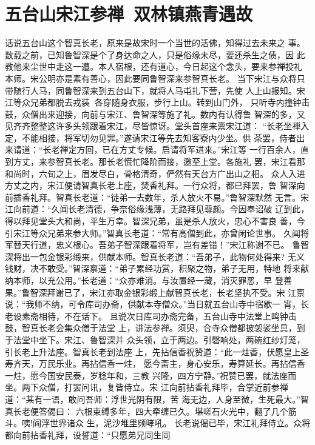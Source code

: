 \chapter{五台山宋江参禅~双林镇燕青遇故}

话说五台山这个智真长老，原来是故宋时一个当世的活佛，知得过去未来之
事。数载之前，已知鲁智深是个了身达命之人，只是俗缘未尽，要还杀生之债，因
此教他来尘世中走这一遭。本人宿根，还有道心，今日起这个念头，要来参禅投礼
本师。宋公明亦是素有善心，因此要同鲁智深来参智真长老。
当下宋江与众将只带随行人马，同鲁智深来到五台山下，就将人马屯扎下营，先使
人上山报知。宋江等众兄弟都脱去戎装，各穿随身衣服，步行上山。转到山门外，
只听寺内撞钟击鼓，众僧出来迎接，向前与宋江、鲁智深等施了礼。数内有认得鲁
智深的多，又见齐齐整整这许多头领跟着宋江，尽皆惊讶。堂头首座来禀宋江道：
“长老坐禅入定，不能相接，将军切勿见罪。”遂请宋江等先去知客寮内少坐。供
茶罢，侍者出来请道：“长老禅定方回，已在方丈专候。启请将军进来。”宋江等
一行百余人，直到方丈，来参智真长老。那长老慌忙降阶而接，邀至上堂。各施礼
罢，宋江看那和尚时，六旬之上，眉发尽白，骨格清奇，俨然有天台方广出山之相。
众人入进方丈之内，宋江便请智真长老上座，焚香礼拜。一行众将，都已拜罢，鲁
智深向前插香礼拜。智真长老道：“徒弟一去数年，杀人放火不易。”鲁智深默然
无言。宋江向前道：“久闻长老清德，争奈俗缘浅薄，无路拜见尊颜。今因奉诏破
辽到此，得以拜见堂头大和尚，平生万幸。智深兄弟，虽是杀人放火，忠心不害良
善，今引宋江等众兄弟来参大师。”智真长老道：“常有高僧到此，亦曾闲论世事。
久闻将军替天行道，忠义根心。吾弟子智深跟着将军，岂有差错！”宋江称谢不已。
鲁智深将出一包金银彩缎来，供献本师。智真长老道：“吾弟子，此物何处得来?
无义钱财，决不敢受。”智深禀道：“弟子累经功赏，积聚之物，弟子无用，特地
将来献纳本师，以充公用。”长老道：“众亦难消。与汝置经一藏，消灭罪恶，早
登善果。”鲁智深拜谢已了，宋江亦取金银彩缎上献智真长老，长老坚执不受。宋
江禀说：“我师不纳，可令库司办斋，供献本寺僧众。”当日就五台山寺中宿歇一
宵，长老设素斋相待，不在话下。
且说次日库司办斋完备，五台山寺中法堂上鸣钟击鼓，智真长老会集众僧于法堂
上，讲法参禅。须臾，合寺众僧都披袈裟坐具，到于法堂中坐下。宋江、鲁智深并
众头领，立于两边。引磬响处，两碗红纱灯笼，引长老上升法座。智真长老到法座
上，先拈信香祝赞道：“此一炷香，伏愿皇上圣寿齐天，万民乐业。再拈信香一炷，
愿今斋主，身心安乐，寿算延长。再拈信香一炷，愿今国安民泰，岁稔年和，三教
兴隆，四方宁静。”祝赞已罢，就法座而坐。两下众僧，打罢问讯，复皆侍立。宋
江向前拈香礼拜毕，合掌近前参禅道：“某有一语，敢问吾师：浮世光阴有限，苦
海无边，人身至微，生死最大。”智真长老便答偈曰：
六根束缚多年，四大牵缠已久。堪嗟石火光中，翻了几个筋斗。咦!阎浮世界诸众
生，泥沙堆里频哮吼。
长老说偈已毕，宋江礼拜侍立。众将都向前拈香礼拜，设誓道：“只愿弟兄同生同
